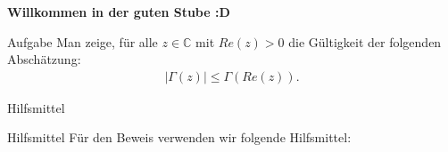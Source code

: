 \documentclass[10pt]{beamer}
\title{}
\author{Artur's \( \oint \) Mathematikstübchen}
\date{}
\def\bC{\mathbb{C}}
\begin{document}

\begin{frame}
    \begin{center}
        \textbf{\huge Willkommen in der guten Stube \newline \newline :D}
    \end{center}
\end{frame}




\begin{frame}
    \begin{alertblock}{Aufgabe}
        Man zeige, für alle \( z \in \bC \) mit \( Re(z) > 0 \) die Gültigkeit der folgenden Abschätzung:
        \begin{align*}
            \left\vert \Gamma( z ) \right\vert
            \leq \Gamma( Re( z ) ).
        \end{align*}
    \end{alertblock}
\end{frame}



\begin{frame}{Hilfsmittel}
    
\end{frame}



\begin{frame}{Hilfsmittel}
    Für den Beweis verwenden wir folgende Hilfsmittel:
\end{frame}
\end{document}
